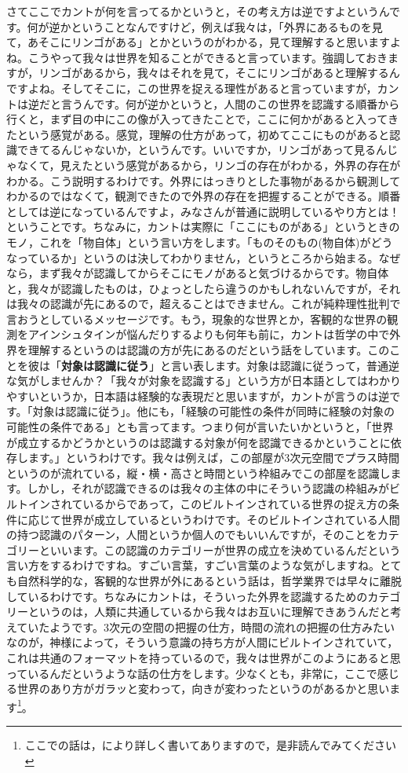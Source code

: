 \documentclass{ltjsbook}
\begin{document}
さてここでカントが何を言ってるかというと，その考え方は逆ですよというんです。何が逆かということなんですけど，例えば我々は，「外界にあるものを見て，あそこにリンゴがある」とかというのがわかる，見て理解すると思いますよね。こうやって我々は世界を知ることができると言っています。強調しておきますが，リンゴがあるから，我々はそれを見て，そこにリンゴがあると理解するんですよね。そしてそこに，この世界を捉える理性があると言っていますが，カントは逆だと言うんです。何が逆かというと，人間のこの世界を認識する順番から行くと，まず目の中にこの像が入ってきたことで，ここに何かがあると入ってきたという感覚がある。感覚，理解の仕方があって，初めてここにものがあると認識できてるんじゃないか，というんです。いいですか，リンゴがあって見るんじゃなくて，見えたという感覚があるから，リンゴの存在がわかる，外界の存在がわかる。こう説明するわけです。外界にはっきりとした事物があるから観測してわかるのではなくて，観測できたので外界の存在を把握することができる。順番としては逆になっているんですよ，みなさんが普通に説明しているやり方とは！ということです。ちなみに，カントは実際に「ここにものがある」というときのモノ，これを「物自体」という言い方をします。「ものそのもの(物自体)がどうなっているか」というのは決してわかりません，というところから始まる。なぜなら，まず我々が認識してからそこにモノがあると気づけるからです。物自体と，我々が認識したものは，ひょっとしたら違うのかもしれないんですが，それは我々の認識が先にあるので，超えることはできません。これが純粋理性批判で言おうとしているメッセージです。もう，現象的な世界とか，客観的な世界の観測をアインシュタインが悩んだりするよりも何年も前に，カントは哲学の中で外界を理解するというのは認識の方が先にあるのだという話をしています。このことを彼は「\textbf{対象は認識に従う}」と言い表します。対象は認識に従うって，普通逆な気がしませんか？「我々が対象を認識する」という方が日本語としてはわかりやすいというか，日本語は経験的な表現だと思いますが，カントが言うのは逆です。「対象は認識に従う」。他にも，「経験の可能性の条件が同時に経験の対象の可能性の条件である」とも言ってます。つまり何が言いたいかというと，「世界が成立するかどうかというのは認識する対象が何を認識できるかということに依存します。」というわけです。我々は例えば，この部屋が3次元空間でプラス時間というのが流れている，縦・横・高さと時間という枠組みでこの部屋を認識します。しかし，それが認識できるのは我々の主体の中にそういう認識の枠組みがビルトインされているからであって，このビルトインされている世界の捉え方の条件に応じて世界が成立しているというわけです。そのビルトインされている人間の持つ認識のパターン，人間というか個人のでもいいんですが，そのことをカテゴリーといいます。この認識のカテゴリーが世界の成立を決めているんだという言い方をするわけですね。すごい言葉，すごい言葉のような気がしますね。とても自然科学的な，客観的な世界が外にあるという話は，哲学業界では早々に離脱しているわけです。ちなみにカントは，そういった外界を認識するためのカテゴリーというのは，人類に共通しているから我々はお互いに理解できあうんだと考えていたようです。3次元の空間の把握の仕方，時間の流れの把握の仕方みたいなのが，神様によって，そういう意識の持ち方が人間にビルトインされていて，これは共通のフォーマットを持っているので，我々は世界がこのようにあると思っているんだというような話の仕方をします。少なくとも，非常に，ここで感じる世界のあり方がガラッと変わって，向きが変わったというのがあるかと思います\footnote{ここでの話は，\textcite{Kurosaki2000}により詳しく書いてありますので，是非読んでみてください}。
\end{document}
